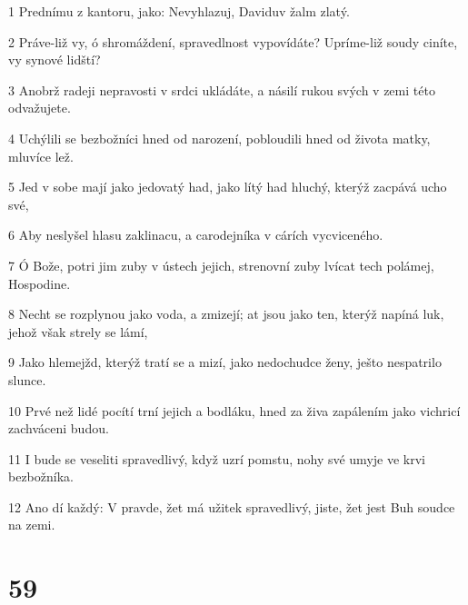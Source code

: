 \par 1 Prednímu z kantoru, jako: Nevyhlazuj, Daviduv žalm zlatý.
\par 2 Práve-liž vy, ó shromáždení, spravedlnost vypovídáte? Upríme-liž soudy ciníte, vy synové lidští?
\par 3 Anobrž radeji nepravosti v srdci ukládáte, a násilí rukou svých v zemi této odvažujete.
\par 4 Uchýlili se bezbožníci hned od narození, pobloudili hned od života matky, mluvíce lež.
\par 5 Jed v sobe mají jako jedovatý had, jako lítý had hluchý, kterýž zacpává ucho své,
\par 6 Aby neslyšel hlasu zaklinacu, a carodejníka v cárích vycviceného.
\par 7 Ó Bože, potri jim zuby v ústech jejich, strenovní zuby lvícat tech polámej, Hospodine.
\par 8 Necht se rozplynou jako voda, a zmizejí; at jsou jako ten, kterýž napíná luk, jehož však strely se lámí,
\par 9 Jako hlemejžd, kterýž tratí se a mizí, jako nedochudce ženy, ješto nespatrilo slunce.
\par 10 Prvé než lidé pocítí trní jejich a bodláku, hned za živa zapálením jako vichricí zachváceni budou.
\par 11 I bude se veseliti spravedlivý, když uzrí pomstu, nohy své umyje ve krvi bezbožníka.
\par 12 Ano dí každý: V pravde, žet má užitek spravedlivý, jiste, žet jest Buh soudce na zemi.

\chapter{59}

